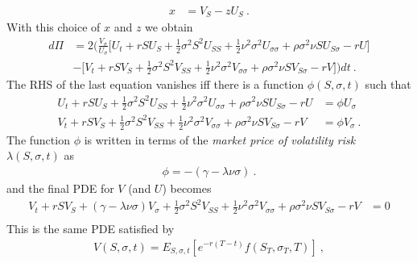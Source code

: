 \documentclass[10pt]{article}
\numberwithin{equation}{section}
\begin{document}
\begin{equation*}
	\begin{split}
		x &= V_S - z U_S \:.
	\end{split}
\end{equation*}
With this choice of $x$ and $z$ we obtain
\begin{equation*}
	\begin{split}
	d\Pi &= 2 \biggl(\frac{V_{\sigma}}{U_{\sigma}}\biggl[U_t + r S U_S + \frac{1}{2} \sigma^2 S^2 U_{SS}+ \frac{1}{2} \nu^2 \sigma^2 U_{\sigma\sigma}  + \rho \sigma^2 \nu S U_{S\sigma} - r U\biggr] \\
	& -\biggl[ V_t + r S V_S + \frac{1}{2} \sigma^2 S^2 V_{SS} + \frac{1}{2} \nu^2 \sigma^2 V_{\sigma\sigma} + \rho \sigma^2 \nu S V_{S\sigma} - r V \biggr] \biggr)dt\:.
	\end{split}
\end{equation*}
The RHS of the last equation vanishes iff there is a function $\phi(S,\sigma,t)$ such that
\begin{equation*}
	\begin{split}
	U_t + r S U_S + \frac{1}{2} \sigma^2 S^2 U_{SS}+ \frac{1}{2} \nu^2 \sigma^2 U_{\sigma\sigma}  + \rho \sigma^2 \nu S U_{S\sigma} - r U&=\phi U_{\sigma}\\
	V_t + r S V_S + \frac{1}{2} \sigma^2 S^2 V_{SS}+ \frac{1}{2} \nu^2 \sigma^2 V_{\sigma\sigma}  + \rho \sigma^2 \nu S V_{S\sigma} - r V &=\phi V_{\sigma}\:.
	\end{split}
\end{equation*}
The function $\phi$ is written in terms of the \emph{market price of volatility risk} $\lambda(S,\sigma,t)$ as
\begin{equation*}
	\begin{split}
	\phi =- (\gamma-\lambda \nu \sigma)\:.
	\end{split}
\end{equation*}
and the final PDE for $V$ (and $U$) becomes
\begin{equation*}
	\begin{split}
	V_t + r S V_S +(\gamma- \lambda \nu \sigma) V_{\sigma}+ \frac{1}{2} \sigma^2 S^2 V_{SS}+ \frac{1}{2} \nu^2 \sigma^2 V_{\sigma\sigma}  + \rho \sigma^2 \nu S V_{S\sigma} - r V&=0\\
	\end{split}
\end{equation*}
This is the same PDE satisfied by
\begin{equation*}
	\begin{split}
	V(S,\sigma,t) = E_{S,\sigma,t} [e^{-r(T-t)} f(S_T,\sigma_T,T)] \:,
	\end{split}
\end{equation*}
\end{document}
